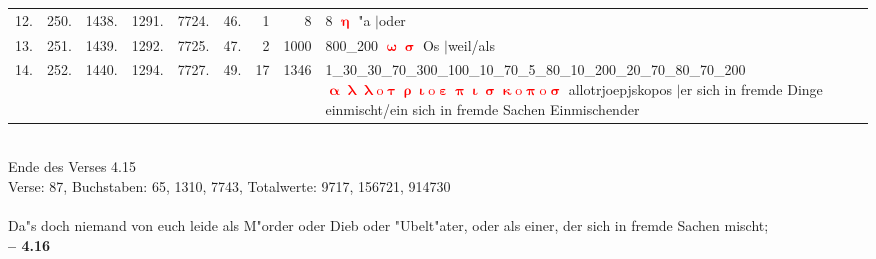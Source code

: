 \documentclass[a4paper,10pt,landscape]{article}
\begin{document}
\begin{tabular}{rrrrrrrrp{120mm}}
12.&250.&1438.&1291.&7724.&46.&1&8&8 \textcolor{red}{$\boldsymbol{\upeta}$} "a $|$oder\\
13.&251.&1439.&1292.&7725.&47.&2&1000&800\_200 \textcolor{red}{$\boldsymbol{\upomega\upsigma}$} Os $|$weil/als\\
14.&252.&1440.&1294.&7727.&49.&17&1346&1\_30\_30\_70\_300\_100\_10\_70\_5\_80\_10\_200\_20\_70\_80\_70\_200 \textcolor{red}{$\boldsymbol{\upalpha\uplambda\uplambda\mathrm{o}\uptau\uprho\upiota\mathrm{o}\upepsilon\uppi\upiota\upsigma\upkappa\mathrm{o}\uppi\mathrm{o}\upsigma}$} allotrjoepjskopos $|$er sich in fremde Dinge einmischt/ein sich in fremde Sachen Einmischender\\
\end{tabular}\medskip \\
Ende des Verses 4.15\\
Verse: 87, Buchstaben: 65, 1310, 7743, Totalwerte: 9717, 156721, 914730\\
\\
Da"s doch niemand von euch leide als M"order oder Dieb oder "Ubelt"ater, oder als einer, der sich in fremde Sachen mischt;\\
\newpage 
{\bf -- 4.16}\\
\medskip \\
\end{document}
